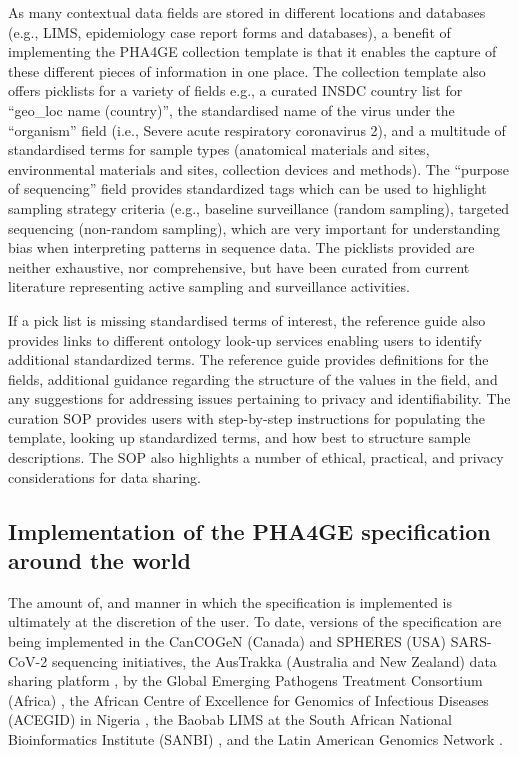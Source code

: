 As many contextual data fields are stored in different locations and databases (e.g., LIMS, epidemiology case report forms and databases), a benefit of implementing the PHA4GE collection template is that it enables the capture of these different pieces of information in one place. The collection template also offers picklists for a variety of fields e.g., a curated INSDC country list for “geo\_loc name (country)”, the standardised name of the virus under the “organism” field (i.e., Severe acute respiratory coronavirus 2), and a multitude of standardised terms for sample types (anatomical materials and sites, environmental materials and sites, collection devices and methods). The “purpose of sequencing” field provides standardized tags which can be used to highlight sampling strategy criteria (e.g., baseline surveillance (random sampling), targeted sequencing (non-random sampling), which are very important for understanding bias when interpreting patterns in sequence data. The picklists provided are neither exhaustive, nor comprehensive, but have been curated from current literature representing active sampling and surveillance activities.

If a pick list is missing standardised terms of interest, the reference guide also provides links to different ontology look-up services enabling users to identify additional standardized terms. The reference guide provides definitions for the fields, additional guidance regarding the structure of the values in the field, and any suggestions for addressing issues pertaining to privacy and identifiability. The curation SOP provides users with step-by-step instructions for populating the template, looking up standardized terms, and how best to structure sample descriptions. The SOP also highlights a number of ethical, practical, and privacy considerations for data sharing.


\subsection{Implementation of the PHA4GE specification around the world}

The amount of, and manner in which the specification is implemented is ultimately at the discretion of the user. To date, versions of the specification are being implemented in the CanCOGeN (Canada) and SPHERES (USA) SARS-CoV-2 sequencing initiatives, the AusTrakka (Australia and New Zealand) data sharing platform \cite{world_health_organization_coronavirus_nodate, dong_interactive_2020, covid-19_genomics_uk_cog-uk_consortiumcontactcogconsortiumuk_integrated_2020}, by the Global Emerging Pathogens Treatment Consortium (Africa) \cite{noauthor_get_nodate}, the African Centre of Excellence for Genomics of Infectious Diseases (ACEGID) in Nigeria \cite{noauthor_acegid_nodate}, the Baobab LIMS \cite{noauthor_welcome_nodate} at the South African National Bioinformatics Institute (SANBI) \cite{noauthor_sanbi_nodate}, and the Latin American Genomics Network \cite{noauthor_covid-19_nodate}. 

